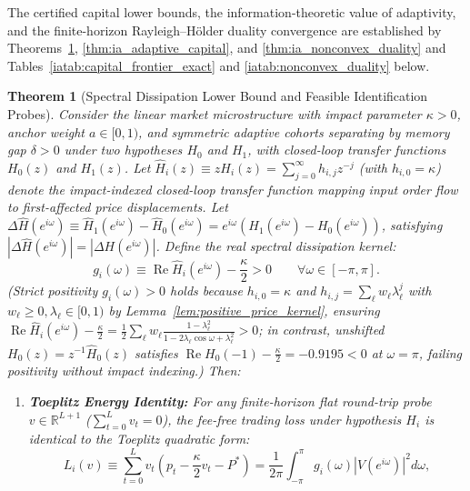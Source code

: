 \documentclass[12pt]{article}
\newtheorem{theorem}{Theorem}[section]
\theoremstyle{definition}
\theoremstyle{remark}
\begin{document}
The certified capital lower bounds, the information-theoretic value of adaptivity, and the finite-horizon Rayleigh--H\"older duality convergence are established by Theorems~\ref{thm:ia_exact_capital}, \ref{thm:ia_adaptive_capital}, and \ref{thm:ia_nonconvex_duality} and Tables~\ref{iatab:capital_frontier_exact} and \ref{iatab:nonconvex_duality} below.

\begin{theorem}[Spectral Dissipation Lower Bound and Feasible Identification Probes]
\label{thm:ia_exact_capital}
Consider the linear market microstructure with impact parameter $\kappa > 0$, anchor weight $a \in [0, 1)$, and symmetric adaptive cohorts separating by memory gap $\delta > 0$ under two hypotheses $H_0$ and $H_1$, with closed-loop transfer functions $H_0(z)$ and $H_1(z)$. Let $\widehat{H}_i(z) \equiv z H_i(z) = \sum_{j=0}^\infty h_{i,j} z^{-j}$ (with $h_{i,0} = \kappa$) denote the impact-indexed closed-loop transfer function mapping input order flow to first-affected price displacements. Let $\Delta \widehat{H}(e^{i\omega}) \equiv \widehat{H}_1(e^{i\omega}) - \widehat{H}_0(e^{i\omega}) = e^{i\omega} (H_1(e^{i\omega}) - H_0(e^{i\omega}))$, satisfying $|\Delta \widehat{H}(e^{i\omega})| = |\Delta H(e^{i\omega})|$. Define the real spectral dissipation kernel:
\begin{equation}
g_i(\omega) \equiv \operatorname{Re} \widehat{H}_i(e^{i\omega}) - \frac{\kappa}{2} > 0 \qquad \forall \omega \in [-\pi, \pi].
\label{eq:ia_spectral_kernel}
\end{equation}
(Strict positivity $g_i(\omega) > 0$ holds because $h_{i,0} = \kappa$ and $h_{i,j} = \sum_\ell w_\ell \lambda_\ell^j$ with $w_\ell \ge 0, \lambda_\ell \in [0, 1)$ by Lemma~\ref{lem:positive_price_kernel}, ensuring $\operatorname{Re}\widehat{H}_i(e^{i\omega}) - \frac{\kappa}{2} = \frac{1}{2}\sum_\ell w_\ell \frac{1-\lambda_\ell^2}{1-2\lambda_\ell\cos\omega+\lambda_\ell^2} > 0$; in contrast, unshifted $H_0(z) = z^{-1}\widehat{H}_0(z)$ satisfies $\operatorname{Re} H_0(-1) - \frac{\kappa}{2} = -0.9195 < 0$ at $\omega = \pi$, failing positivity without impact indexing.)
Then:
\begin{enumerate}
\item \textbf{Toeplitz Energy Identity:} For any finite-horizon flat round-trip probe $v \in \mathbb{R}^{L+1}$ ($\sum_{t=0}^L v_t = 0$), the fee-free trading loss under hypothesis $H_i$ is identical to the Toeplitz quadratic form:
\begin{equation}
L_i(v) \equiv \sum_{t=0}^L v_t \left( p_t - \frac{\kappa}{2} v_t - P^* \right) = \frac{1}{2\pi} \int_{-\pi}^\pi g_i(\omega) \left| V(e^{i\omega}) \right|^2 d\omega,

\end{equation}
\end{enumerate}
\end{theorem}
\end{document}
